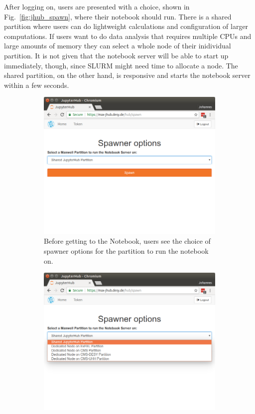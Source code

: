 \documentclass[10pt]{scrartcl}
\begin{document}
After logging on, users are presented with a choice, shown in Fig.~\ref{fig:jhub_spawn}, where their notebook should run.
There is a shared partition where users can do lightweight calculations and configuration of larger computations.
If users want to do data analysis that requires multiple CPUs and large amounts of memory they can select a whole node of their inidividual partition.
It is not given that the notebook server will be able to start up immediately, though, since SLURM might need time to allocate a node.
The shared partition, on the other hand, is responsive and starts the notebook server within a few seconds.
%
\begin{figure}
  \centering
    \begin{subfigure}{0.45\textwidth} %
	  \includegraphics[width=\textwidth]{figures/jhub004.png}
	  \caption{Before getting to the Notebook, users see the choice of spawner options for the partition to run the notebook on.} %
  \end{subfigure}
  \vspace{1em} %
  \begin{subfigure}{0.45\textwidth} %
	  \includegraphics[width=\textwidth]{figures/jhub005.png}

\end{subfigure}
\end{figure}
\end{document}

